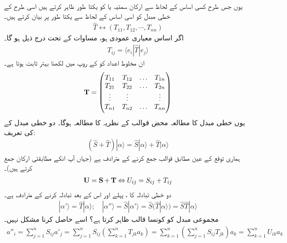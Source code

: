 یوں جس طرح کسی اساس کے لحاظ سے  ارکان  سمتیہ یا  کو یکتا طور ظاہر کرتے ہیں اسی طرح  کے    خطی مبدل  کو اسی اساس کے لحاظ سے یکتا طور پر بیان کرتے ہیں۔
\begin{align}
	\hat{T}\leftrightarrow(T_{11}, T_{12}, \cdots, T_{nn})
\end{align}
اگر اساس معیاری عمودی ہو،   مساوات   کے تحت درج ذیل ہو گا۔
\begin{align}
	T_{ij}=\langle e_i|\hat{T}|e_j\rangle
\end{align}
ان مخلوط اعداد کو  کے روپ  میں لکھنا بہتر ثابت ہوتا ہے۔ 
\begin{align}
	\operatorname{\mathbf{T}}=
	\begin{pmatrix}
		T_{11} & T_{12} & \dots & T_{1n}\\
		T_{21} & T_{22} & \dots & T_{2n}\\
		\vdots & \vdots & & \vdots\\
		T_{n1} & T_{n2} & \dots & T_{nn}
	\end{pmatrix}
\end{align}
یوں خطی مبدل کا مطالعہ  محض قوالب کے نظریہ کا مطالعہ ہوگا۔  دو خطی مبدل کے     کی تعریف:
\begin{align}
	(\hat{S}+\hat{T})|\alpha\rangle=\hat{S}|\alpha\rangle+\hat{T}|\alpha\rangle
\end{align}
  ہماری توقع کے عین مطابق   قوالب جمع کرنے کے مترادف ہے  (جہاں آپ انکے مطابقتی ارکان جمع کرتے ہیں)۔
\begin{align}
	\operatorname{\mathbf{U}} = \operatorname{\mathbf{S}}+\operatorname{\mathbf{T}} \Leftrightarrow U_{ij}=S_{ij}+T_{ij}
\end{align}
دو خطی تبادلہ  کا    ،  پہلے  اور اس کے بعد  تبادلہ  کرنے کے مترادف ہے۔
\begin{align}
	|\alpha'\rangle=\hat{T}|\alpha\rangle;\quad|\alpha''\rangle=\hat{S}|\alpha'\rangle=\hat{S}(\hat{T}|\alpha\rangle)=\hat{S}\hat{T}|\alpha\rangle
\end{align}
مجموعی مبدل  کو کونسا قالب  ظاہر کرتا ہے؟ اسے حاصل کرنا مشکل نہیں۔
\begin{align*}
	a''_i=\sum_{j=1}^{n}S_{ij}a'_j=\sum_{j=1}^{n}S_{ij}\left(\sum_{k=1}^{n}T_{jk}a_k\right)=\sum_{k=1}^{n}\left(\sum_{j=1}^{n}S_{ij}T_{jk}\right)a_k=\sum_{k=1}^{n}U_{ik}a_k
\end{align*}
